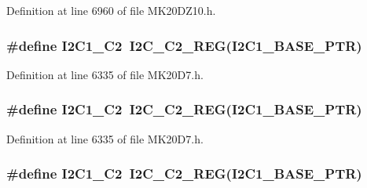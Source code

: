 Definition at line 6960 of file M\+K20\+D\+Z10.\+h.

\subsubsection[{\texorpdfstring{I2\+C1\+\_\+\+C2}{I2C1_C2}}]{\setlength{\rightskip}{0pt plus 5cm}\#define I2\+C1\+\_\+\+C2~{\bf I2\+C\+\_\+\+C2\+\_\+\+R\+EG}({\bf I2\+C1\+\_\+\+B\+A\+S\+E\+\_\+\+P\+TR})}\hypertarget{group___i2_c___register___accessor___macros_ga23604e2320135c1d7488c51e1b8257be}{}\label{group___i2_c___register___accessor___macros_ga23604e2320135c1d7488c51e1b8257be}


Definition at line 6335 of file M\+K20\+D7.\+h.

\subsubsection[{\texorpdfstring{I2\+C1\+\_\+\+C2}{I2C1_C2}}]{\setlength{\rightskip}{0pt plus 5cm}\#define I2\+C1\+\_\+\+C2~{\bf I2\+C\+\_\+\+C2\+\_\+\+R\+EG}({\bf I2\+C1\+\_\+\+B\+A\+S\+E\+\_\+\+P\+TR})}\hypertarget{group___i2_c___register___accessor___macros_ga23604e2320135c1d7488c51e1b8257be}{}\label{group___i2_c___register___accessor___macros_ga23604e2320135c1d7488c51e1b8257be}


Definition at line 6335 of file M\+K20\+D7.\+h.

\subsubsection[{\texorpdfstring{I2\+C1\+\_\+\+C2}{I2C1_C2}}]{\setlength{\rightskip}{0pt plus 5cm}\#define I2\+C1\+\_\+\+C2~{\bf I2\+C\+\_\+\+C2\+\_\+\+R\+EG}({\bf I2\+C1\+\_\+\+B\+A\+S\+E\+\_\+\+P\+TR})}\hypertarget{group___i2_c___register___accessor___macros_ga23604e2320135c1d7488c51e1b8257be}{}\label{group___i2_c___register___accessor___macros_ga23604e2320135c1d7488c51e1b8257be}


